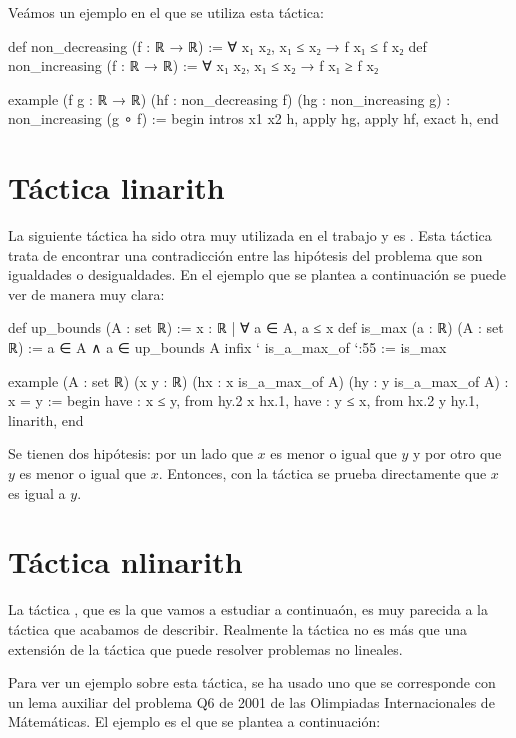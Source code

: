 Veámos un ejemplo en el que se utiliza esta táctica:
\begin{leancode}
def non_decreasing (f : ℝ → ℝ) := ∀ x₁ x₂, x₁ ≤ x₂ → f x₁ ≤ f x₂
def non_increasing (f : ℝ → ℝ) := ∀ x₁ x₂, x₁ ≤ x₂ → f x₁ ≥ f x₂

example (f g : ℝ → ℝ) (hf : non_decreasing f) (hg : non_increasing g) : 
non_increasing (g ∘ f) :=
begin
  intros x1 x2 h,
  apply hg,
  apply hf,
  exact h,
end
\end{leancode}


\section{Táctica linarith}
La siguiente táctica ha sido otra muy utilizada en el trabajo y es
. Esta táctica trata de encontrar una contradicción
entre las hipótesis del problema que son igualdades o desigualdades. En el
ejemplo que se plantea a continuación se puede ver de manera muy clara:

\begin{leancode}
def up_bounds (A : set ℝ) := { x : ℝ | ∀ a ∈ A, a ≤ x}
def is_max (a : ℝ) (A : set ℝ) := a ∈ A ∧ a ∈ up_bounds A
infix ` is_a_max_of `:55 := is_max

example (A : set ℝ) (x y : ℝ) (hx : x is_a_max_of A) (hy : y is_a_max_of A) :
x = y :=
begin
  have : x ≤ y, from hy.2 x hx.1,
  have : y ≤ x, from hx.2 y hy.1,
  linarith,
end
\end{leancode}

Se tienen dos hipótesis: por un lado que \(x\) es menor o igual que \(y\) y por
otro que \(y\) es menor o igual que \(x\). Entonces, con la táctica
 se prueba directamente que \(x\) es igual a \(y\).

\section{Táctica nlinarith}
La táctica , que es la que vamos a estudiar a
continuaón, es muy parecida a la táctica  que
acabamos de describir. Realmente la táctica  no
es más que una extensión de la táctica  que puede
resolver problemas no lineales.

Para ver un ejemplo sobre esta táctica, se ha usado uno que se corresponde con
un lema auxiliar del problema Q6 de 2001 de las Olimpiadas Internacionales de
Mátemáticas. El ejemplo es el que se plantea a continuación:

